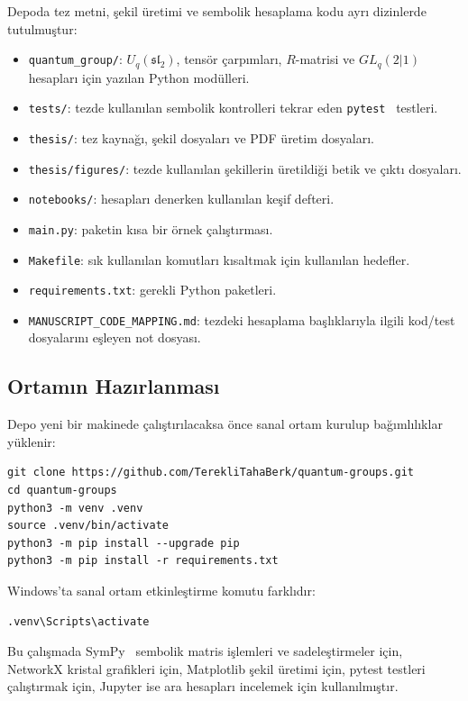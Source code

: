 \documentclass[10pt]{math}
\numberwithin{equation}{section}
\theoremstyle{plain}
\theoremstyle{definition}
\renewcommand{\sl}{\mathfrak{sl}}
\begin{document}
Depoda tez metni, şekil üretimi ve sembolik hesaplama kodu ayrı dizinlerde
tutulmuştur:
\begin{itemize}[leftmargin=*]
  \item \texttt{quantum\_group/}: $U_q(\sl_2)$, tensör çarpımları, $R$-matrisi
        ve $GL_q(2|1)$ hesapları için yazılan Python modülleri.
  \item \texttt{tests/}: tezde kullanılan sembolik kontrolleri tekrar eden
        \texttt{pytest}~\cite{pytest} testleri.
  \item \texttt{thesis/}: tez kaynağı, şekil dosyaları ve PDF üretim dosyaları.
  \item \texttt{thesis/figures/}: tezde kullanılan şekillerin üretildiği betik
        ve çıktı dosyaları.
  \item \texttt{notebooks/}: hesapları denerken kullanılan keşif defteri.
  \item \texttt{main.py}: paketin kısa bir örnek çalıştırması.
  \item \texttt{Makefile}: sık kullanılan komutları kısaltmak için kullanılan
        hedefler.
  \item \texttt{requirements.txt}: gerekli Python paketleri.
  \item \texttt{MANUSCRIPT\_CODE\_MAPPING.md}: tezdeki hesaplama başlıklarıyla
        ilgili kod/test dosyalarını eşleyen not dosyası.
\end{itemize}

\subsection{Ortamın Hazırlanması}

Depo yeni bir makinede çalıştırılacaksa önce sanal ortam kurulup bağımlılıklar
yüklenir:
\begin{lstlisting}[style=bashblock]
git clone https://github.com/TerekliTahaBerk/quantum-groups.git
cd quantum-groups
python3 -m venv .venv
source .venv/bin/activate
python3 -m pip install --upgrade pip
python3 -m pip install -r requirements.txt
\end{lstlisting}

Windows'ta sanal ortam etkinleştirme komutu farklıdır:
\begin{lstlisting}[style=bashblock]
.venv\Scripts\activate
\end{lstlisting}

Bu çalışmada SymPy~\cite{SymPy} sembolik matris işlemleri ve sadeleştirmeler için, NetworkX
kristal grafikleri için, Matplotlib şekil üretimi için, pytest testleri
çalıştırmak için, Jupyter ise ara hesapları incelemek için kullanılmıştır.
\end{document}
